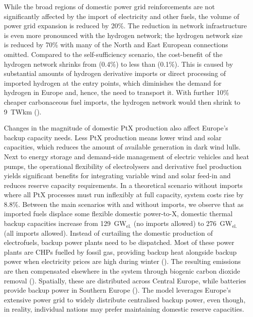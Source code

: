 While the broad regions of domestic power grid reinforcements are not
significantly affected by the import of electricity and other fuels, the volume
of power grid expansion is reduced by 20\%. The reduction in network
infrastructure is even more pronounced with the hydrogen network; the hydrogen
network size is reduced by 70\% with many of the North and East European
connections omitted. Compared to the self-sufficiency scenario, the cost-benefit
of the hydrogen network shrinks from  (0.4\%) to less than 
(0.1\%). This is caused by substantial amounts of hydrogen derivative imports or
direct processing of imported hydrogen at the entry points, which diminishes the
demand for hydrogen in Europe and, hence, the need to transport it. With further
10\% cheaper carbonaceous fuel imports, the hydrogen network would then shrink
to 9~TWkm ().


Changes in the magnitude of domestic PtX production also affect Europe's backup
capacity needs. Less PtX production means lower wind and solar capacities, which
reduces the amount of available generation in dark wind lulls. Next to energy
storage and demand-side management of electric vehicles and heat pumps, the
operational flexibility of electrolysers and derivative fuel production yields
significant benefits for integrating variable wind and solar feed-in and reduces
reserve capacity requirements. In a theoretical scenario without imports where
all PtX processes must run inflexibly at full capacity, system costs rise by
8.8\%. Between the main scenarios with and without imports, we observe that as
imported fuels displace some flexible domestic power-to-X, domestic thermal
backup capacities increase from 129~GW$_\text{el.}$ (no imports allowed) to
276~GW$_\text{el.}$ (all imports allowed). Instead of curtailing the domestic
production of electrofuels, backup power plants need to be dispatched. Most of
these power plants are CHPs fuelled by fossil gas, providing backup heat
alongside backup power when electricity prices are high during winter
(). The resulting emissions are then compensated
elsewhere in the system through biogenic carbon dioxide removal
(). Spatially, these are distributed across Central
Europe, while batteries provide backup power in Southern Europe
(). The model leverages Europe's extensive
power grid to widely distribute centralised backup power, even though, in
reality, individual nations may prefer maintaining domestic reserve capacities.

